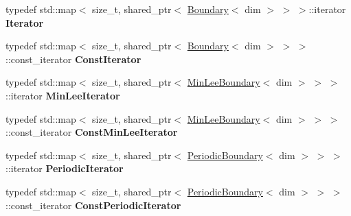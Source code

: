 \begin{DoxyCompactItemize}
\item 
\hypertarget{classnatrium_1_1BoundaryCollection_a8f113a1640c2f088c86f24cf9ddf4be6}{
typedef std::map$<$ size\_\-t, shared\_\-ptr$<$ \hyperlink{classnatrium_1_1Boundary}{Boundary}$<$ dim $>$ $>$ $>$::iterator {\bfseries Iterator}}
\label{classnatrium_1_1BoundaryCollection_a8f113a1640c2f088c86f24cf9ddf4be6}

\item 
\hypertarget{classnatrium_1_1BoundaryCollection_a7b7a9bd9ff95ffe3cfdec0d6efcbdf81}{
typedef std::map$<$ size\_\-t, shared\_\-ptr$<$ \hyperlink{classnatrium_1_1Boundary}{Boundary}$<$ dim $>$ $>$ $>$::const\_\-iterator {\bfseries ConstIterator}}
\label{classnatrium_1_1BoundaryCollection_a7b7a9bd9ff95ffe3cfdec0d6efcbdf81}

\item 
\hypertarget{classnatrium_1_1BoundaryCollection_aba4f994dd4290e55b888ac51800bbe9e}{
typedef std::map$<$ size\_\-t, shared\_\-ptr$<$ \hyperlink{classnatrium_1_1MinLeeBoundary}{MinLeeBoundary}$<$ dim $>$ $>$ $>$::iterator {\bfseries MinLeeIterator}}
\label{classnatrium_1_1BoundaryCollection_aba4f994dd4290e55b888ac51800bbe9e}

\item 
\hypertarget{classnatrium_1_1BoundaryCollection_a5248927752b4e9ac21dfc1a3e010e79d}{
typedef std::map$<$ size\_\-t, shared\_\-ptr$<$ \hyperlink{classnatrium_1_1MinLeeBoundary}{MinLeeBoundary}$<$ dim $>$ $>$ $>$::const\_\-iterator {\bfseries ConstMinLeeIterator}}
\label{classnatrium_1_1BoundaryCollection_a5248927752b4e9ac21dfc1a3e010e79d}

\item 
\hypertarget{classnatrium_1_1BoundaryCollection_a7cf1943ddd37e2d31d41483365de04a2}{
typedef std::map$<$ size\_\-t, shared\_\-ptr$<$ \hyperlink{classnatrium_1_1PeriodicBoundary}{PeriodicBoundary}$<$ dim $>$ $>$ $>$::iterator {\bfseries PeriodicIterator}}
\label{classnatrium_1_1BoundaryCollection_a7cf1943ddd37e2d31d41483365de04a2}

\item 
\hypertarget{classnatrium_1_1BoundaryCollection_a132c389d4a4c65e2fad4c428c7183f8b}{
typedef std::map$<$ size\_\-t, shared\_\-ptr$<$ \hyperlink{classnatrium_1_1PeriodicBoundary}{PeriodicBoundary}$<$ dim $>$ $>$ $>$::const\_\-iterator {\bfseries ConstPeriodicIterator}}
\label{classnatrium_1_1BoundaryCollection_a132c389d4a4c65e2fad4c428c7183f8b}

\end{DoxyCompactItemize}
